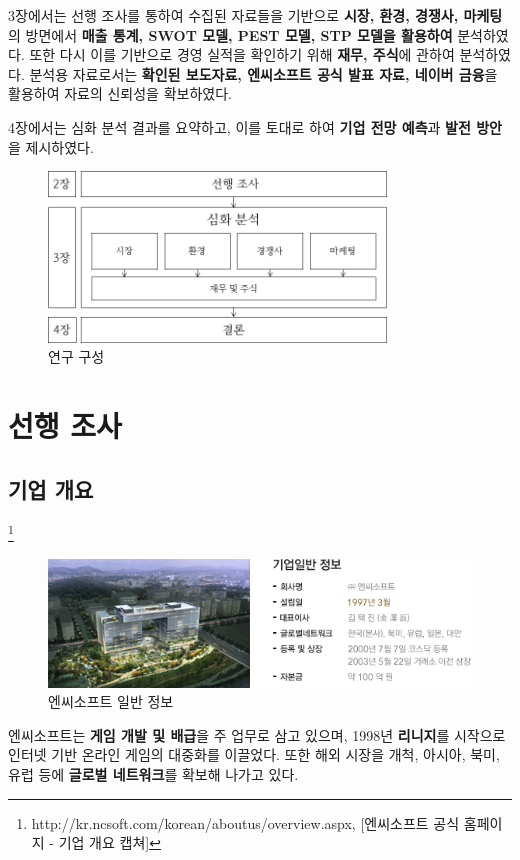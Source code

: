 \documentclass[11pt]{oblivoir}
\begin{document}
			3장에서는 선행 조사를 통하여 수집된 자료들을 기반으로 \textbf{시장, 환경, 경쟁사, 마케팅}의 방면에서 \textbf{매출 통계, SWOT 모델, PEST 모델, STP 모델을 활용하여} 분석하였다. 또한 다시 이를 기반으로 경영 실적을 확인하기 위해 \textbf{재무, 주식}에 관하여 분석하였다. 분석용 자료로서는 \textbf{확인된 보도자료, 엔씨소프트 공식 발표 자료, 네이버 금융}을 활용하여 자료의 신뢰성을 확보하였다.
			
			4장에서는 심화 분석 결과를 요약하고, 이를 토대로 하여 \textbf{기업 전망 예측}과 \textbf{발전 방안}을 제시하였다.
			\begin{figure}[htbp]
				\centering
				\includegraphics[width=0.8\textwidth]{Pictures/Methods.png}
				\caption{연구 구성}
			\end{figure}
			
	
	\section{선행 조사}
		\subsection{기업 개요}
		\noindent 
		\footnote{http://kr.ncsoft.com/korean/aboutus/overview.aspx, [엔씨소프트 공식 홈페이지 - 기업 개요 캡쳐]}
		\begin{figure}[htbp]
			\centering
			\includegraphics[width=1\textwidth]{Pictures/ncinfo.png}
			\caption{엔씨소프트 일반 정보}
		\end{figure} 
		
		엔씨소프트는 \textbf{게임 개발 및 배급}을 주 업무로 삼고 있으며, 1998년 \textbf{리니지}를 시작으로 인터넷 기반 온라인 게임의 대중화를 이끌었다. 또한 해외 시장을 개척, 아시아, 북미, 유럽 등에 \textbf{글로벌 네트워크}를 확보해 나가고 있다.
		
\end{document}
